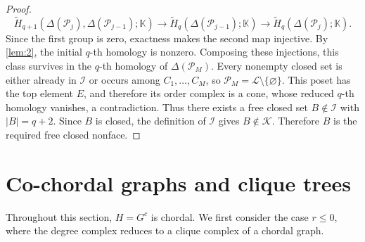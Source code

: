 \documentclass[11pt]{amsart}
\newtheorem{lemma}[theorem]{Lemma}
\theoremstyle{definition}
\newcommand{\kk}{\mathbb K}
\newcommand{\cL}{\mathcal L}
\newcommand{\cI}{\mathcal I}
\begin{document}
\begin{proof}
\[
\widetilde H_{q+1}
(\Delta(\mathcal P_j),\Delta(\mathcal P_{j-1});\kk)
\longrightarrow
\widetilde H_q(\Delta(\mathcal P_{j-1});\kk)
\longrightarrow
\widetilde H_q(\Delta(\mathcal P_j);\kk).
\]
Since the first group is zero, exactness makes the second map injective. By \cref{lem:2}, the initial $q$-th homology is nonzero. Composing these injections, this class survives in the $q$-th homology of $\Delta(\mathcal P_M)$. Every nonempty closed set is either already in $\cI$ or occurs among $C_1,\dots,C_M$, so $\mathcal P_M=\cL\setminus\{\varnothing\}$. This poset has the top element $E$, and therefore its order complex is a cone, whose reduced $q$-th homology vanishes, a contradiction. Thus there exists a free closed set $B\notin\cI$ with $|B|=q+2$. Since $B$ is closed, the definition of $\cI$ gives $B\notin\mathcal K$. Therefore $B$ is the required free closed nonface.
\end{proof}

\section{Co-chordal graphs and clique trees}\label{sec:4}

Throughout this section, $H=G^c$ is chordal. We first consider the case $r\le0$, where the degree complex reduces to a clique complex of a chordal graph.

\end{document}

